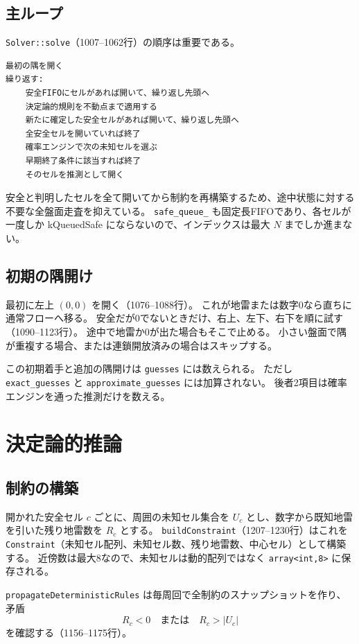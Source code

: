 \documentclass[uplatex,dvipdfmx,11pt]{jsarticle}
\newcommand{\code}[1]{\texttt{#1}}
\newcommand{\State}[1]{\textsf{#1}}
\begin{document}
\subsection{主ループ}
\code{Solver::solve}（1007--1062行）の順序は重要である。

\begin{lstlisting}
最初の隅を開く
繰り返す:
    安全FIFOにセルがあれば開いて、繰り返し先頭へ
    決定論的規則を不動点まで適用する
    新たに確定した安全セルがあれば開いて、繰り返し先頭へ
    全安全セルを開いていれば終了
    確率エンジンで次の未知セルを選ぶ
    早期終了条件に該当すれば終了
    そのセルを推測として開く
\end{lstlisting}

安全と判明したセルを全て開いてから制約を再構築するため、途中状態に対する不要な全盤面走査を抑えている。
\code{safe\_queue\_} も固定長FIFOであり、各セルが一度しか \State{kQueuedSafe} にならないので、インデックスは最大 $N$ までしか進まない。

\subsection{初期の隅開け}
最初に左上 $(0,0)$ を開く（1076--1088行）。
これが地雷または数字0なら直ちに通常フローへ移る。
安全だが0でないときだけ、右上、左下、右下を順に試す（1090--1123行）。
途中で地雷か0が出た場合もそこで止める。
小さい盤面で隅が重複する場合、または連鎖開放済みの場合はスキップする。

この初期着手と追加の隅開けは \code{guesses} には数えられる。
ただし \code{exact\_guesses} と \code{approximate\_guesses} には加算されない。
後者2項目は確率エンジンを通った推測だけを数える。

\section{決定論的推論}

\subsection{制約の構築}
開かれた安全セル $c$ ごとに、周囲の未知セル集合を $U_c$ とし、数字から既知地雷を引いた残り地雷数を $R_c$ とする。
\code{buildConstraint}（1207--1230行）はこれを
\code{Constraint}（未知セル配列、未知セル数、残り地雷数、中心セル）として構築する。
近傍数は最大8なので、未知セルは動的配列ではなく \code{array<int,8>} に保存される。

\code{propagateDeterministicRules} は毎周回で全制約のスナップショットを作り、矛盾
\[
  R_c<0 \quad\text{または}\quad R_c>|U_c|
\]
を確認する（1156--1175行）。
\end{document}
